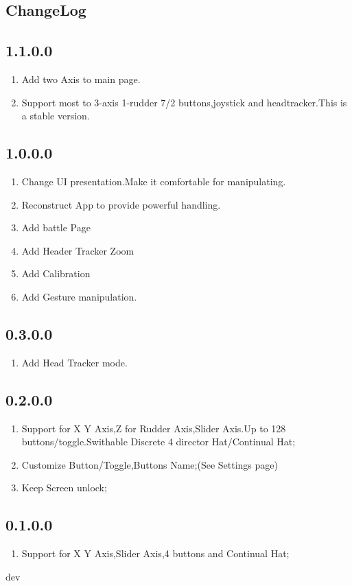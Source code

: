 \documentclass[12pt,a4paper]{article}
\begin{document}
\begin{CJK}{UTF8}{gbsn}
\section{ChangeLog}
\subsection{1.1.0.0}
\begin{enumerate}
	\item Add two Axis to main page.
	\item Support most to 3-axis 1-rudder 7/2 buttons,joystick and headtracker.This is a stable version.
\end{enumerate}
\subsection{1.0.0.0}
\begin{enumerate}
	\item Change UI presentation.Make it comfortable for manipulating.
	\item Reconstruct App to provide powerful handling.
	\item Add battle Page
	\item Add Header Tracker Zoom
	\item Add Calibration
	\item Add Gesture manipulation.
\end{enumerate}
\subsection{0.3.0.0}
\begin{enumerate}
	\item Add Head Tracker mode.
\end{enumerate}
\subsection{0.2.0.0}
\begin{enumerate}
	\item Support for X Y Axis,Z for Rudder Axis,Slider Axis.Up to 128 buttons/toggle.Swithable Discrete 4 director Hat/Continual Hat;
	\item Customize Button/Toggle,Buttons Name;(See Settings page)
	\item Keep Screen unlock;
\end{enumerate}
\subsection{0.1.0.0}
\begin{enumerate}
	\item Support for X Y Axis,Slider Axis,4 buttons and Continual Hat;
\end{enumerate}
dev
\end{CJK}
\end{document}
